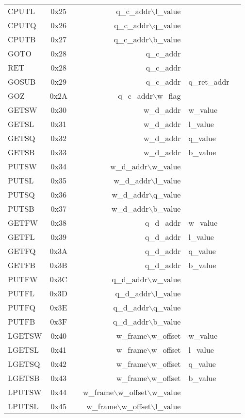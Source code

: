 \documentclass {article}
\begin{document}
\begin {tabular}{l|c|l|r@{--}l|l}
CPUTL	& 0x25		& 		&q\_c\_addr$\backslash$l\_value&\\
CPUTQ	& 0x26		& 		&q\_c\_addr$\backslash$q\_value&\\
CPUTB	& 0x27		& 		&q\_c\_addr$\backslash$b\_value&\\
GOTO	& 0x28		& 		&q\_c\_addr&\\
RET	& 0x28		& 		&q\_c\_addr&\\
GOSUB	& 0x29		& 		&q\_c\_addr&q\_ret\_addr\\
GOZ	& 0x2A		& 		&q\_c\_addr$\backslash$w\_flag&\\
GETSW	& 0x30		& 		&w\_d\_addr&w\_value\\
GETSL	& 0x31		& 		&w\_d\_addr&l\_value\\
GETSQ	& 0x32		& 		&w\_d\_addr&q\_value\\
GETSB	& 0x33		& 		&w\_d\_addr&b\_value\\
PUTSW	& 0x34		& 		&w\_d\_addr$\backslash$w\_value&\\
PUTSL	& 0x35		& 		&w\_d\_addr$\backslash$l\_value&\\
PUTSQ	& 0x36		& 		&w\_d\_addr$\backslash$q\_value&\\
PUTSB	& 0x37		& 		&w\_d\_addr$\backslash$b\_value&\\
GETFW	& 0x38		& 		&q\_d\_addr&w\_value\\
GETFL	& 0x39		& 		&q\_d\_addr&l\_value\\
GETFQ	& 0x3A		& 		&q\_d\_addr&q\_value\\
GETFB	& 0x3B		& 		&q\_d\_addr&b\_value\\
PUTFW	& 0x3C		& 		&q\_d\_addr$\backslash$w\_value&\\
PUTFL	& 0x3D		& 		&q\_d\_addr$\backslash$l\_value&\\
PUTFQ	& 0x3E		& 		&q\_d\_addr$\backslash$q\_value&\\
PUTFB	& 0x3F		& 		&q\_d\_addr$\backslash$b\_value&\\
LGETSW& 0x40		& 		&w\_frame$\backslash$w\_offset&w\_value\\
LGETSL& 0x41		& 		&w\_frame$\backslash$w\_offset&l\_value\\
LGETSQ& 0x42		& 		&w\_frame$\backslash$w\_offset&q\_value\\
LGETSB& 0x43		& 		&w\_frame$\backslash$w\_offset&b\_value\\
LPUTSW& 0x44		& 		&w\_frame$\backslash$w\_offset$\backslash$w\_value&\\
LPUTSL& 0x45		& 		&w\_frame$\backslash$w\_offset$\backslash$l\_value&\\

\end{tabular}
\end{document}
